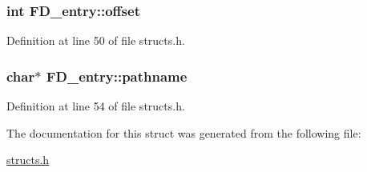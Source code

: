 \hypertarget{struct_f_d__entry_a8cb331b4498a68fca8cc03256a678abb}{
\subsubsection[{offset}]{\setlength{\rightskip}{0pt plus 5cm}int F\-D\-\_\-entry\-::offset}}\label{struct_f_d__entry_a8cb331b4498a68fca8cc03256a678abb}


Definition at line 50 of file structs.\-h.

\hypertarget{struct_f_d__entry_ab49d494b001884423ed0b27c35fe8373}{
\subsubsection[{pathname}]{\setlength{\rightskip}{0pt plus 5cm}char$\ast$ F\-D\-\_\-entry\-::pathname}}\label{struct_f_d__entry_ab49d494b001884423ed0b27c35fe8373}


Definition at line 54 of file structs.\-h.



The documentation for this struct was generated from the following file\-:\begin{DoxyCompactItemize}
\item 
\hyperlink{structs_8h}{structs.\-h}\end{DoxyCompactItemize}
